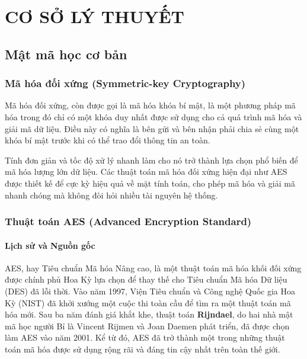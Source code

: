 \chapter{CƠ SỞ LÝ THUYẾT}

\section{Mật mã học cơ bản}
\subsection{Mã hóa đối xứng (Symmetric-key Cryptography)}
Mã hóa đối xứng, còn được gọi là mã hóa khóa bí mật, là một phương pháp mã hóa trong đó chỉ có một khóa duy nhất được sử dụng cho cả quá trình mã hóa và giải mã dữ liệu. Điều này có nghĩa là bên gửi và bên nhận phải chia sẻ cùng một khóa bí mật trước khi có thể trao đổi thông tin an toàn.

Tính đơn giản và tốc độ xử lý nhanh làm cho nó trở thành lựa chọn phổ biến để mã hóa lượng lớn dữ liệu. Các thuật toán mã hóa đối xứng hiện đại như AES được thiết kế để cực kỳ hiệu quả về mặt tính toán, cho phép mã hóa và giải mã nhanh chóng mà không đòi hỏi nhiều tài nguyên hệ thống.

\subsection{Thuật toán AES (Advanced Encryption Standard)}
\subsubsection{Lịch sử và Nguồn gốc}
AES, hay Tiêu chuẩn Mã hóa Nâng cao, là một thuật toán mã hóa khối đối xứng được chính phủ Hoa Kỳ lựa chọn để thay thế cho Tiêu chuẩn Mã hóa Dữ liệu (DES) đã lỗi thời. Vào năm 1997, Viện Tiêu chuẩn và Công nghệ Quốc gia Hoa Kỳ (NIST) đã khởi xướng một cuộc thi toàn cầu để tìm ra một thuật toán mã hóa mới. Sau ba năm đánh giá khắt khe, thuật toán \textbf{Rijndael}, do hai nhà mật mã học người Bỉ là Vincent Rijmen và Joan Daemen phát triển, đã được chọn làm AES vào năm 2001. Kể từ đó, AES đã trở thành một trong những thuật toán mã hóa được sử dụng rộng rãi và đáng tin cậy nhất trên toàn thế giới.


